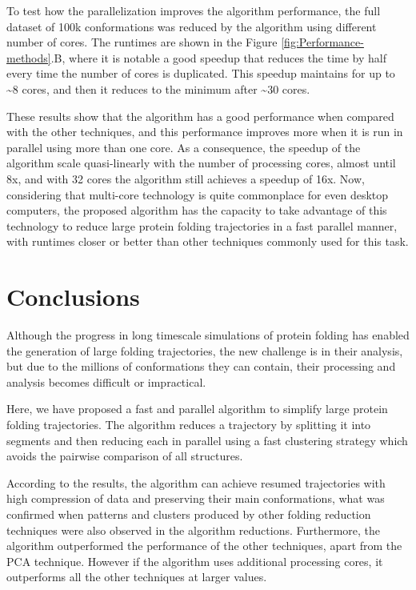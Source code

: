 \documentclass[american,twocolumn]{bmcart}
\begin{document}
To test how the parallelization improves the algorithm performance, the full dataset of 100k conformations was reduced by the algorithm using different number of cores. The runtimes are shown in the Figure \ref{fig:Performance-methods}.B, where it is notable a good speedup that reduces the time by half every time the number of cores is duplicated. This speedup maintains for up to \textasciitilde{}8 cores, and then it reduces to the minimum after \textasciitilde{}30 cores.

These results show that the algorithm has a good performance when compared with the other techniques, and this performance improves more when it is run in parallel using more than one core. As a consequence, the speedup of the algorithm scale quasi-linearly with the number of processing cores, almost until 8x, and with 32 cores the algorithm still achieves a speedup of 16x. Now, considering that multi-core technology is quite commonplace for even desktop computers, the proposed algorithm has the capacity to take advantage of this technology to reduce large protein folding trajectories in a fast parallel manner, with runtimes closer or better than other techniques commonly used for this task.

\section*{Conclusions}

Although the progress in long timescale simulations of protein folding has enabled the generation of large folding trajectories, the new challenge is in their analysis, but due to the millions of conformations they can contain, their processing and analysis becomes difficult or impractical. 

Here, we have proposed a fast and parallel algorithm to simplify large protein folding trajectories. The algorithm reduces a trajectory by splitting it into segments and then reducing each in parallel using a fast clustering strategy which avoids the pairwise comparison of all structures. 

According to the results, the algorithm can achieve resumed trajectories with high compression of data and preserving their main conformations, what was confirmed when patterns and clusters produced by other folding reduction techniques were also observed in the algorithm reductions. Furthermore, the algorithm outperformed the performance of the other techniques, apart from the PCA technique. However if the algorithm uses additional processing cores, it outperforms all the other techniques at larger values. 
\end{document}
